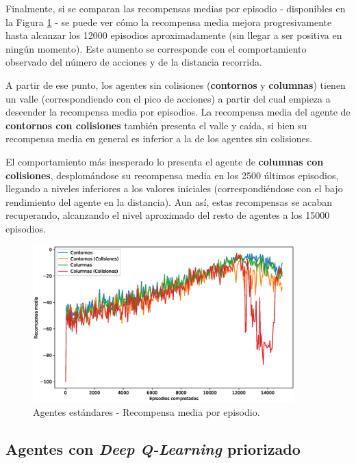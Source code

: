 Finalmente, si se comparan las recompensas medias por episodio - disponibles en la Figura \ref{fig:chap6-standard-rewards} - se puede ver cómo la recompensa media mejora progresivamente hasta alcanzar los 12000 episodios aproximadamente (sin llegar a ser positiva en ningún momento). Este aumento se corresponde con el comportamiento observado del número de acciones y de la distancia recorrida.

A partir de ese punto, los agentes sin colisiones (\textbf{contornos} y \textbf{columnas}) tienen un valle (correspondiendo con el pico de acciones) a partir del cual empieza a descender la recompensa media por episodios. La recompensa media del agente de \textbf{contornos con colisiones} también presenta el valle y caída, si bien su recompensa media en general es inferior a la de los agentes sin colisiones.

El comportamiento más inesperado lo presenta el agente de \textbf{columnas con colisiones}, desplomándose su recompensa media en los 2500 últimos episodios, llegando a niveles inferiores a los valores iniciales (correspondiéndose con el bajo rendimiento del agente en la distancia). Aun así, estas recompensas se acaban recuperando, alcanzando el nivel aproximado del resto de agentes a los 15000 episodios.

\begin{figure}[H]
    \centering
    \includegraphics[width=0.9\textwidth]{imagenes/cap6/standard/smoothed_rewards.eps}
    \caption{Agentes estándares - Recompensa media por episodio.}
    \label{fig:chap6-standard-rewards}
\end{figure}

\subsection{Agentes con \textit{Deep Q-Learning} priorizado}


